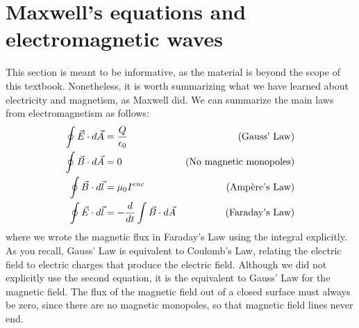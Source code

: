 \section{Maxwell's equations and electromagnetic waves}
This section is meant to be informative, as the material is beyond the scope of this textbook. Nonetheless, it is worth summarizing what we have learned about electricity and magnetism, as Maxwell did. We can summarize the main laws from electromagnetism as follows:
\begin{align*}
\oint \vec E\cdot d\vec A &= \frac{Q}{\epsilon_0}&\text{(Gauss' Law)}\\
\oint \vec B\cdot d\vec A &= 0 &\text{(No magnetic monopoles)}\\
\oint \vec B\cdot d\vec l &= \mu_0 I^{enc} &\text{(\ampere's Law)}\\
\oint \vec E\cdot d\vec l &= -\frac{d}{dt}\int \vec B\cdot d\vec A  &\text{(Faraday's Law)}\\
\end{align*}
where we wrote the magnetic flux in Faraday's Law using the integral explicitly. As you recall, Gauss' Law is equivalent to Coulomb's Law, relating the electric field to electric charges that produce the electric field. Although we did not explicitly use the second equation, it is the equivalent to Gauss' Law for the magnetic field. The flux of the magnetic field out of a closed surface must always be zero, since there are no magnetic monopoles, so that magnetic field lines never end.

